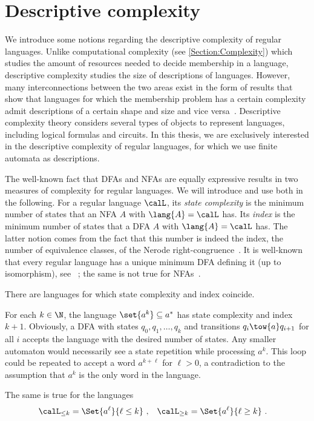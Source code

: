 \documentclass[../../diss.tex]{subfiles}
\begin{document}
\section{Descriptive complexity}%
\label{Section:DescriptiveComplexity}%

We introduce some notions regarding the descriptive complexity of regular languages.
Unlike computational complexity (see \cref{Section:Complexity}) which studies the amount of resources needed to decide membership in a language, descriptive complexity studies the size of descriptions of languages.
However, many interconnections between the two areas exist in the form of results that show that languages for which the membership problem has a certain complexity admit descriptions of a certain shape and size and vice versa~\cite{Immerman98}.
Descriptive complexity theory considers several types of objects to represent languages, including logical formulas and circuits.
In this thesis, we are exclusively interested in the descriptive complexity of regular languages, for which we use finite automata as descriptions.

The well-known fact that DFAs and NFAs are equally expressive results in two measures of complexity for regular languages.
We will introduce and use both in the following.
For a regular language $\calL$, its \emph{state complexity} is the minimum number of states that an NFA $A$ with $\lang{A} = \calL$ has.
Its \emph{index} is the minimum number of states that a DFA $A$ with $\lang{A} = \calL$ has.
The latter notion comes from the fact that this number is indeed the index, the number of equivalence classes, of the Nerode right-congruence~\cite{Nerode58}.
It is well-known that every regular language has a unique minimum DFA defining it (up to isomorphism), see \eg~\cite{HopcroftU79}; the same is not true for NFAs~\cite{JiangR93}.

There are languages for which state complexity and index coincide.

\begin{example}%
\label{Example:StateComplexityEqualsIndex}%
    For each $k \in \N$, the language $\set{ a^k } \subseteq a^*$ has state complexity and index $k+1$.
    Obviously, a DFA with states $q_0, q_1, \ldots, q_k$ and transitions $q_{i} \tow{a} q_{i+1}$ for all $i$ accepts the language with the desired number of states.
    Any smaller automaton would necessarily see a state repetition while processing $a^k$.
    This loop could be repeated to accept a word $a^{k+\ell}$ for $\ell > 0$, a contradiction to the assumption that $a^k$ is the only word in the language.

    The same is true for the languages
    \begin{align*}
        \calL_{\leq k} &= \Set{ a^\ell }{\ell \leq k}
        \ ,
        &
        \calL_{\geq k} &= \Set{ a^\ell }{\ell \geq k}
        \ .
    \end{align*}
\end{example}
\end{document}
